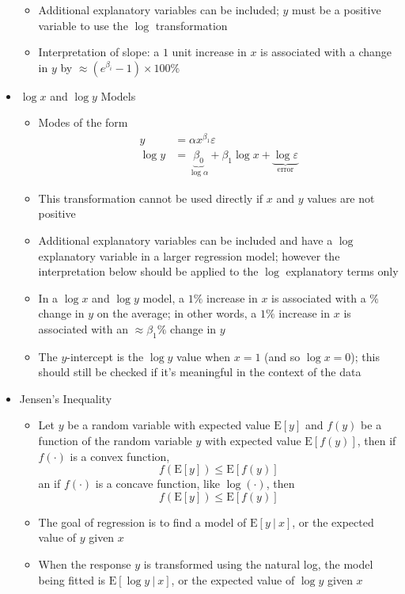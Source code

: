 \documentclass[12pt]{article}
\begin{document}
\begin{itemize}
\begin{itemize}
\item Additional explanatory variables can be included; $y$ must be a positive variable to use the $\log$ transformation 
\item Interpretation of slope: a $1$ unit increase in $x$ is associated with a change in $y$ by $\approx (e^{\beta_i} - 1) \times 100\%$ \end{itemize}
\item $\log x$ and $\log y$ Models \begin{itemize} 
\item Modes of the form $$ \begin{aligned} y &= \alpha x^{\beta_1}\varepsilon \\ \log y &= \underbrace{\beta_0}_{\log \alpha} + \beta_1 \log x + \underbrace{\log \varepsilon}_{\text{error}} \end{aligned} $$ 
\item This transformation cannot be used directly if $x$ and $y$ values are not positive 
\item Additional explanatory variables can be included and have a $\log$ explanatory variable in a larger regression model; however the interpretation below should be applied to the $\log$ explanatory terms only
\item In a $\log x$ and $\log y$ model, a $1 \%$ increase in $x$ is associated with a $\%$ change in $y$ on the average; in other words, a $1\%$ increase in $x$ is associated with an $\approx \beta_1 \%$ change in $y$ 
\item The $y$-intercept is the $\log y$ value when $x = 1$ (and so $\log x = 0$); this should still be checked if it's meaningful in the context of the data \end{itemize} 
\item Jensen's Inequality \begin{itemize} 
\item Let $y$ be a random variable with expected value $\text{E}[y]$ and $f(y)$ be a function of the random variable $y$ with expected value $\text{E}[f(y)]$, then if $f(\cdot)$ is a convex function, $$ f(\text{E}[y]) \leq \text{E}[f(y)] $$ an if $f(\cdot)$ is a concave function, like $\log(\cdot)$, then $$f(\text{E}[y]) \leq \text{E}[f(y)] $$ 
\item The goal of regression is to find a model of $\text{E}[y~|~x]$, or the expected value of $y$ given $x$
\item When the response $y$ is transformed using the natural log, the model being fitted is $\text{E}[\log y ~|~ x]$, or the expected value of $\log y$ given $x$

\end{itemize}
\end{itemize}
\end{document}
